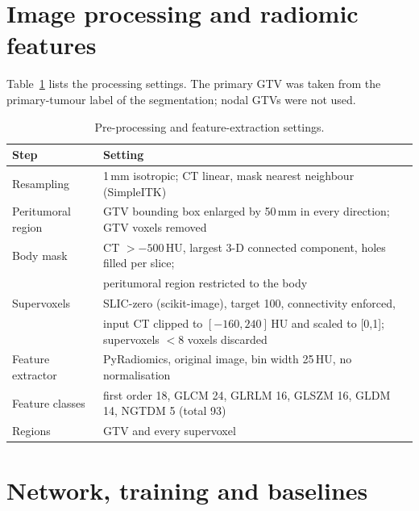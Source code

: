 \documentclass[11pt]{article}
\providecommand{\botrule}{\bottomrule}
\begin{document}
\begin{table}[!htb]
\centering
\caption{Eligible patients and events in the Head-Neck-PET-CT clinical file, and those with CT and primary GTV used in this study.}\label{tab:missing}

\end{table}

\section{Image processing and radiomic features}

Table~\ref{tab:preproc} lists the processing settings. The primary GTV was taken from the primary-tumour label of the segmentation; nodal GTVs were not used.

\begin{table}[!htb]
\centering\small
\caption{Pre-processing and feature-extraction settings.}\label{tab:preproc}
\begin{tabular}{@{}ll@{}}
\toprule
Step & Setting \\
\midrule
Resampling & 1\,mm isotropic; CT linear, mask nearest neighbour (SimpleITK) \\
Peritumoral region & GTV bounding box enlarged by 50\,mm in every direction; GTV voxels removed \\
Body mask & CT $>-500$\,HU, largest 3-D connected component, holes filled per slice; \\
 & peritumoral region restricted to the body \\
Supervoxels & SLIC-zero (scikit-image), target 100, connectivity enforced, \\
 & input CT clipped to $[-160, 240]$\,HU and scaled to [0,1]; supervoxels $<8$ voxels discarded \\
Feature extractor & PyRadiomics, original image, bin width 25\,HU, no normalisation \\
Feature classes & first order 18, GLCM 24, GLRLM 16, GLSZM 16, GLDM 14, NGTDM 5 (total 93) \\
Regions & GTV and every supervoxel \\
\botrule
\end{tabular}
\end{table}

\section{Network, training and baselines}
\end{document}
